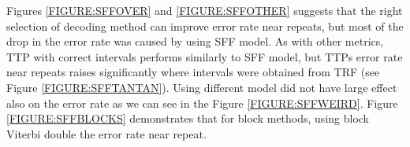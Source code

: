 Figures \ref{FIGURE:SFFOVER} and \ref{FIGURE:SFFOTHER} suggests that the right
selection of decoding method can improve error rate near repeats, but most of
the drop in the error rate was caused by using SFF model. As with other
metrics, TTP with correct intervals performs similarly to SFF model, but TTPs
error rate near repeats raises significantly where intervals were obtained from
TRF (see Figure \ref{FIGURE:SFFTANTAN}). Using different  model did not have
large effect also on the error rate as we can see in the Figure
\ref{FIGURE:SFFWEIRD}. Figure \ref{FIGURE:SFFBLOCKS} demonstrates that for
block methods, using block Viterbi double the error rate near repeat.

\label{LastPage}
